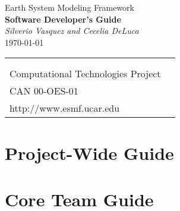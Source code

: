 \documentclass[english]{article}
\begin{document}

\begin{titlepage}

\begin{center}
{\Large    Earth System Modeling Framework } \\
{\Large {\bf  Software Developer's Guide}} \\
\medskip
{\it Silverio Vasquez and Cecelia DeLuca} \\
\vspace{.5in}
{\large \today}
\end{center}

\begin{latexonly}
\vspace{6in}
\begin{tabular}{p{5in}p{.9in}}
\hrulefill \\
\noindent {\bf NASA Earth Science Technology Office} \\
\noindent Computational Technologies Project \\
\noindent CAN 00-OES-01 \\
\noindent http://www.esmf.ucar.edu \\
\end{tabular}
\end{latexonly}

\end{titlepage}

\tableofcontents

\newpage



\setcounter{section}{0}
\newpage
\begin{htmlonly}
\end{htmlonly}
\part{Project-Wide Guide}


\setcounter{section}{0}
\newpage
\begin{htmlonly}
\end{htmlonly}
\part{Core Team Guide}

\end{document}
